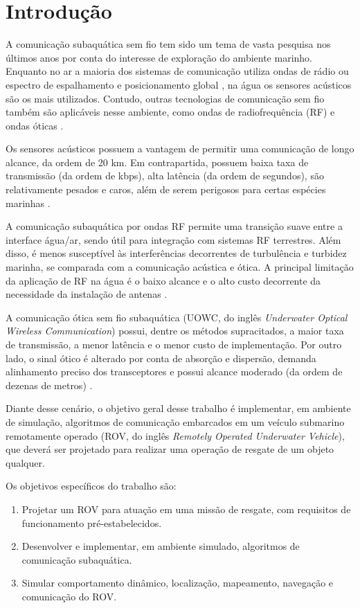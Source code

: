 \section{Introdução}
\label{sec:introducao}


A comunicação subaquática sem fio tem sido um tema de vasta pesquisa nos últimos anos por conta do interesse de exploração do ambiente marinho. Enquanto no ar a maioria dos sistemas de comunicação utiliza ondas de rádio ou espectro de espalhamento e posicionamento global \cite{Paull2014}, na água os sensores acústicos são os mais utilizados. Contudo, outras tecnologias de comunicação sem fio também são aplicáveis nesse ambiente, como ondas de radiofrequência (RF) e ondas óticas \cite{Ur-Rehman2018}.

Os sensores acústicos possuem a vantagem de permitir uma comunicação de longo alcance, da ordem de 20 km. Em contrapartida, possuem baixa taxa de transmissão (da ordem de kbps), alta latência (da ordem de segundos), são relativamente pesados e caros, além de serem perigosos para certas espécies marinhas \cite{Ur-Rehman2018}.

A comunicação subaquática por ondas RF permite uma transição suave entre a interface água/ar, sendo útil para integração com sistemas RF terrestres. Além disso, é menos susceptível às interferências decorrentes de turbulência e turbidez marinha, se comparada com a comunicação acústica e ótica. A principal limitação da aplicação de RF na água é o baixo alcance e o alto custo decorrente da necessidade da instalação de antenas \cite{Ur-Rehman2018}.

A comunicação ótica sem fio subaquática (UOWC, do inglês \textit{Underwater Optical Wireless Communication}) possui, dentre os métodos supracitados, a maior taxa de transmissão, a menor latência e o menor custo de implementação. Por outro lado, o sinal ótico é alterado por conta de absorção e dispersão, demanda alinhamento preciso dos transceptores e possui alcance moderado (da ordem de dezenas de metros) \cite{Ur-Rehman2018}.

Diante desse cenário, o objetivo geral desse trabalho é implementar, em ambiente de simulação, algoritmos de comunicação embarcados em um veículo submarino remotamente operado (ROV, do inglês \textit{Remotely Operated Underwater Vehicle}), que deverá ser projetado para realizar uma operação de resgate de um objeto qualquer.

Os objetivos específicos do trabalho são:
\begin{enumerate}
	\item Projetar um ROV para atuação em uma missão de resgate, com requisitos de funcionamento pré-estabelecidos.
	\item Desenvolver e implementar, em ambiente simulado, algoritmos de comunicação subaquática.
	\item Simular comportamento dinâmico, localização, mapeamento, navegação e comunicação do ROV.
\end{enumerate}

